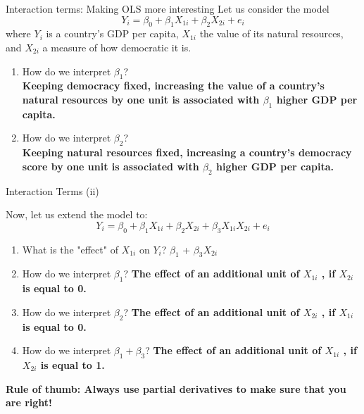 \documentclass[11pt]{beamer}
\begin{document}
\begin{frame}{Interaction terms: Making OLS more interesting}
 Let us consider the model
        $$ Y_i = \beta_0 + \beta_1 X_{1i} + \beta_2 X_{2i}  
        +   e_i $$
        where $Y_i$ is a country's GDP per capita, $X_{1i}$ the value of its natural resources, and $X_{2i}$ a measure of how democratic it is.
        \begin{enumerate}
            \item How do we interpret $\beta_1$? \\ \pause 
            \textbf{Keeping democracy fixed, increasing the value of a country's natural resources by one unit is associated with $\beta_1$ higher GDP per capita.}
            \item How do we interpret $\beta_2$? \\ \pause 
            \textbf{Keeping natural resources fixed, increasing a country's democracy score by one unit  is associated with $\beta_2$ higher GDP per capita.}
        \end{enumerate}

 \end{frame}
 


 \begin{frame}{Interaction Terms (ii)}
 
 Now, let us extend the model to:
        $$ Y_i = \beta_0 + \beta_1 X_{1i} + \beta_2 X_{2i}  
        + \beta_3 X_{1i}  X_{2i}
        +   e_i $$
        \begin{enumerate}
         \item What is the "effect" of $X_{1i}$ on $Y_i$?  \pause $\beta_1$ + $\beta_3 X_{2i}$
         \pause
            \item How do we interpret $\beta_1$?  \pause \textbf{The effect of an additional unit of $X_{1i}$ {\color{orange}, if $X_{2i}$ is equal to 0}.}
        \pause
            \item How do we interpret $\beta_2$? \pause  \textbf{The effect of an additional unit of $X_{2i}$ {\color{orange}, if $X_{1i}$ is equal to 0}.}
            \pause
            \item How do we interpret $\beta_1 + \beta_3$?  \pause  \textbf{The effect of an additional unit of $X_{1i}$ {\color{orange}, if $X_{2i}$ is equal to 1}.}
            
        \end{enumerate}


{\textbf{\color{TolLightBlue} Rule of thumb: Always use partial derivatives to make sure that you are right!}}

\end{frame}
\end{document}
